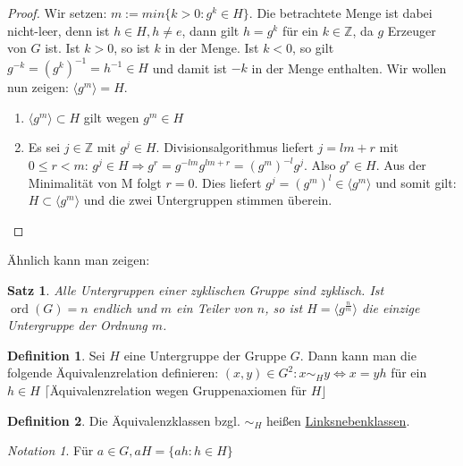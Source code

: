 \documentclass[12pt]{scrartcl}%
\newtheorem{thm}{Satz}
\theoremstyle{definition}
\newtheorem*{defn}{Definition}
\theoremstyle{remark}
\newtheorem*{notation}{Notation}
\DeclareMathOperator\ord{ord}
\newcommand{\inv}[1]{\left(#1\right)^{-1}}
\newcommand{\Inv}[1]{#1^{-1}}
\begin{document}
\begin{proof}
    Wir setzen: $m := min \lbrace k>0 : g^{k} \in H \rbrace$. Die betrachtete Menge ist dabei nicht-leer, denn ist $h \in H, h \neq e$, dann gilt $h = g^{k}$ für ein $k\in\mathbb{Z}$, da $g$ Erzeuger von $G$ ist. Ist $k>0$, so ist $k$ in der Menge. Ist $k<0$, so gilt $g^{-k}=\inv{{g^k}}=\Inv{h}\in H$ und damit ist $-k$ in der Menge enthalten. Wir wollen nun zeigen: $\langle g^{m} \rangle = H$.
	\begin{enumerate}
		\item $\langle g^{m} \rangle \subset H$ gilt wegen $g^{m} \in H$
		\item Es sei $j \in  \mathbb{Z}$ mit $g^{j} \in H$. Divisionsalgorithmus liefert $j=lm+r$ mit $0 \leq r < m$: $g^{j} \in H \Rightarrow g^{r}=g^{-lm}g^{lm+r}=(g^{m})^{-l}g^{j}$. Also $g^{r} \in H$. Aus der Minimalität von M folgt $r=0$. Dies liefert $g^{j}=(g^{m})^{l} \in \langle g^{m} \rangle$ und somit gilt: $H \subset \langle g^{m} \rangle$ und die zwei Untergruppen stimmen überein.
	\end{enumerate}
\end{proof}

Ähnlich kann man zeigen:

\begin{thm}
	Alle Untergruppen einer zyklischen Gruppe sind zyklisch. Ist $\ord(G)=n$ endlich und $m$ ein Teiler von $n$, so ist $H = \langle g^{\frac{n}{m}}\rangle$ die einzige Untergruppe der Ordnung $m$. %
\end{thm}

\begin{defn}
	Sei $H$ eine Untergruppe der Gruppe $G$. Dann kann man die folgende Äquivalenzrelation definieren: \newline $(x,y) \in G^{2}: x \sim_{H} y \Leftrightarrow x = yh$ für ein $h \in H$ \newline $\lceil$Äquivalenzrelation wegen Gruppenaxiomen für $H\rfloor$
\end{defn}

\begin{defn}
	Die Äquivalenzklassen bzgl. $\sim_{H}$ heißen \underline{Linksnebenklassen}.
\end{defn}

\begin{notation}
	Für $a \in G, aH = \{ah : h \in H\}$
\end{notation}
\end{document}
